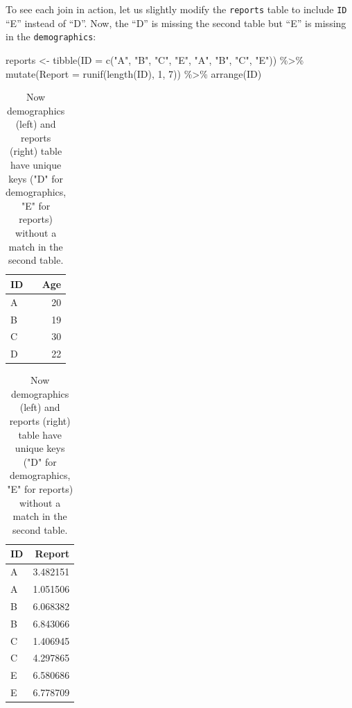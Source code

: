\documentclass[
]{book}
\newenvironment{Shaded}{\begin{snugshade}}{\end{snugshade}}
\newcommand{\AttributeTok}[1]{\textcolor[rgb]{0.77,0.63,0.00}{#1}}
\newcommand{\DecValTok}[1]{\textcolor[rgb]{0.00,0.00,0.81}{#1}}
\newcommand{\FunctionTok}[1]{\textcolor[rgb]{0.00,0.00,0.00}{#1}}
\newcommand{\NormalTok}[1]{#1}
\newcommand{\OtherTok}[1]{\textcolor[rgb]{0.56,0.35,0.01}{#1}}
\newcommand{\SpecialCharTok}[1]{\textcolor[rgb]{0.00,0.00,0.00}{#1}}
\newcommand{\StringTok}[1]{\textcolor[rgb]{0.31,0.60,0.02}{#1}}
\begin{document}
To see each join in action, let us slightly modify the \texttt{reports} table to include \texttt{ID} ``E'' instead of ``D''. Now, the ``D'' is missing the second table but ``E'' is missing in the \texttt{demographics}:

\begin{Shaded}
\begin{Highlighting}[]
\NormalTok{reports }\OtherTok{\textless{}{-}} 
  \FunctionTok{tibble}\NormalTok{(}\AttributeTok{ID =} \FunctionTok{c}\NormalTok{(}\StringTok{"A"}\NormalTok{, }\StringTok{"B"}\NormalTok{, }\StringTok{"C"}\NormalTok{, }\StringTok{"E"}\NormalTok{, }\StringTok{"A"}\NormalTok{, }\StringTok{"B"}\NormalTok{, }\StringTok{"C"}\NormalTok{, }\StringTok{"E"}\NormalTok{)) }\SpecialCharTok{\%\textgreater{}\%}
  \FunctionTok{mutate}\NormalTok{(}\AttributeTok{Report =} \FunctionTok{runif}\NormalTok{(}\FunctionTok{length}\NormalTok{(ID), }\DecValTok{1}\NormalTok{, }\DecValTok{7}\NormalTok{)) }\SpecialCharTok{\%\textgreater{}\%}
  \FunctionTok{arrange}\NormalTok{(ID)}
\end{Highlighting}
\end{Shaded}

\begin{table}
\caption{\label{tab:unnamed-chunk-187}Now demographics (left) and reports (right) table have unique keys ("D" for demographics, "E" for reports) without a match in the second table.}

\centering
\begin{tabular}[t]{l|r}
\hline
ID & Age\\
\hline
A & 20\\
\hline
B & 19\\
\hline
C & 30\\
\hline
D & 22\\
\hline
\end{tabular}
\centering
\begin{tabular}[t]{l|r}
\hline
ID & Report\\
\hline
A & 3.482151\\
\hline
A & 1.051506\\
\hline
B & 6.068382\\
\hline
B & 6.843066\\
\hline
C & 1.406945\\
\hline
C & 4.297865\\
\hline
E & 6.580686\\
\hline
E & 6.778709\\
\hline
\end{tabular}
\end{table}
\end{document}
